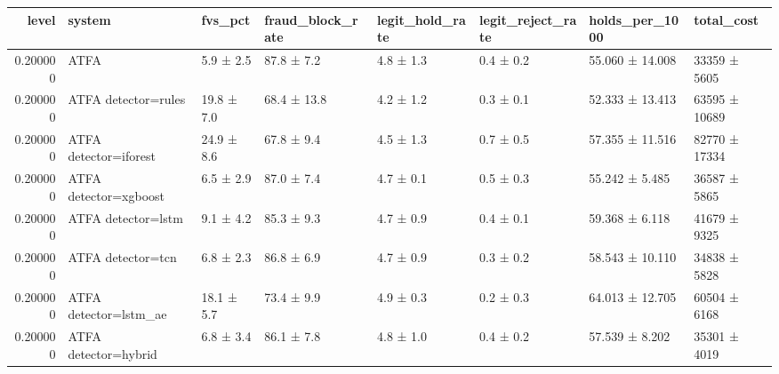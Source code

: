 \begin{tabular}{rlllllll}
\toprule
level & system & fvs\_pct & fraud\_block\_rate & legit\_hold\_rate & legit\_reject\_rate & holds\_per\_1000 & total\_cost \\
\midrule
0.200000 & ATFA & 5.9 ± 2.5 & 87.8 ± 7.2 & 4.8 ± 1.3 & 0.4 ± 0.2 & 55.060 ± 14.008 & 33359 ± 5605 \\
0.200000 & ATFA detector=rules & 19.8 ± 7.0 & 68.4 ± 13.8 & 4.2 ± 1.2 & 0.3 ± 0.1 & 52.333 ± 13.413 & 63595 ± 10689 \\
0.200000 & ATFA detector=iforest & 24.9 ± 8.6 & 67.8 ± 9.4 & 4.5 ± 1.3 & 0.7 ± 0.5 & 57.355 ± 11.516 & 82770 ± 17334 \\
0.200000 & ATFA detector=xgboost & 6.5 ± 2.9 & 87.0 ± 7.4 & 4.7 ± 0.1 & 0.5 ± 0.3 & 55.242 ± 5.485 & 36587 ± 5865 \\
0.200000 & ATFA detector=lstm & 9.1 ± 4.2 & 85.3 ± 9.3 & 4.7 ± 0.9 & 0.4 ± 0.1 & 59.368 ± 6.118 & 41679 ± 9325 \\
0.200000 & ATFA detector=tcn & 6.8 ± 2.3 & 86.8 ± 6.9 & 4.7 ± 0.9 & 0.3 ± 0.2 & 58.543 ± 10.110 & 34838 ± 5828 \\
0.200000 & ATFA detector=lstm\_ae & 18.1 ± 5.7 & 73.4 ± 9.9 & 4.9 ± 0.3 & 0.2 ± 0.3 & 64.013 ± 12.705 & 60504 ± 6168 \\
0.200000 & ATFA detector=hybrid & 6.8 ± 3.4 & 86.1 ± 7.8 & 4.8 ± 1.0 & 0.4 ± 0.2 & 57.539 ± 8.202 & 35301 ± 4019 \\
\bottomrule
\end{tabular}
